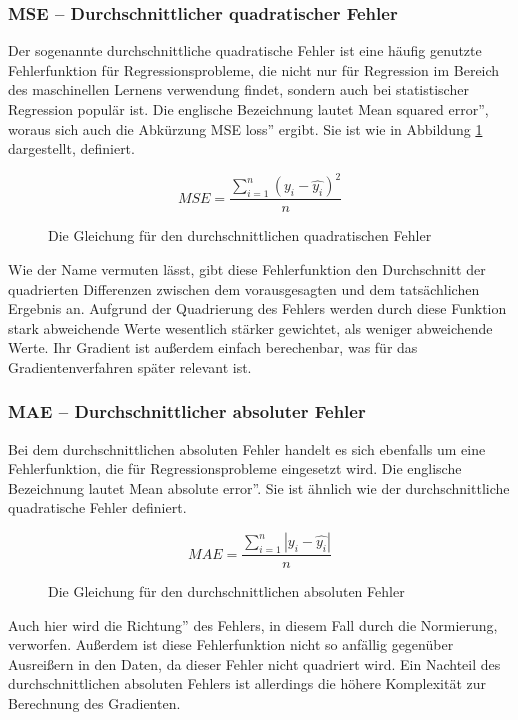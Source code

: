 \documentclass[11pt]{article}
\begin{document}
\subsubsection{MSE -- Durchschnittlicher quadratischer Fehler}
Der sogenannte durchschnittliche quadratische Fehler ist eine häufig genutzte Fehlerfunktion für Regressionsprobleme, die nicht nur für Regression im Bereich des maschinellen Lernens verwendung findet, sondern auch bei statistischer Regression populär ist. Die englische Bezeichnung lautet \glqq Mean squared error'', woraus sich auch die Abkürzung \glqq MSE loss'' ergibt. Sie ist wie in Abbildung \ref{MSE_equation} dargestellt, definiert.
\begin{figure}[h]
	\begin{equation*}
		MSE=\dfrac{\sum\limits_{i=1}^n(y_i-\hat{y_i})^2}{n}
	\end{equation*}
	\caption{Die Gleichung für den durchschnittlichen quadratischen Fehler}
	\label{MSE_equation}
\end{figure}
\newline
Wie der Name vermuten lässt, gibt diese Fehlerfunktion den Durchschnitt der quadrierten Differenzen zwischen dem vorausgesagten und dem tatsächlichen Ergebnis an. Aufgrund der Quadrierung des Fehlers werden durch diese Funktion stark abweichende Werte wesentlich stärker gewichtet, als weniger abweichende Werte. Ihr Gradient ist außerdem einfach berechenbar, was für das Gradientenverfahren später relevant ist.\cite{3}
\subsubsection{MAE -- Durchschnittlicher absoluter Fehler}
Bei dem durchschnittlichen absoluten Fehler handelt es sich ebenfalls um eine Fehlerfunktion, die für Regressionsprobleme eingesetzt wird. Die englische Bezeichnung lautet \glqq Mean absolute error''. Sie ist ähnlich wie der durchschnittliche quadratische Fehler definiert.
\begin{figure}[h]
	\begin{equation*}
	MAE=\dfrac{\sum\limits_{i=1}^n|y_i-\hat{y_i}|}{n}
	\end{equation*}
	\caption{Die Gleichung für den durchschnittlichen absoluten Fehler}
	\label{MAE_equation}
\end{figure}
\newline
Auch hier wird die \glqq Richtung'' des Fehlers, in diesem Fall durch die Normierung, verworfen. Außerdem ist diese Fehlerfunktion nicht so anfällig gegenüber Ausreißern in den Daten, da dieser Fehler nicht quadriert wird. Ein Nachteil des durchschnittlichen absoluten Fehlers ist allerdings die höhere Komplexität zur Berechnung des Gradienten.\cite{3}
\end{document}
